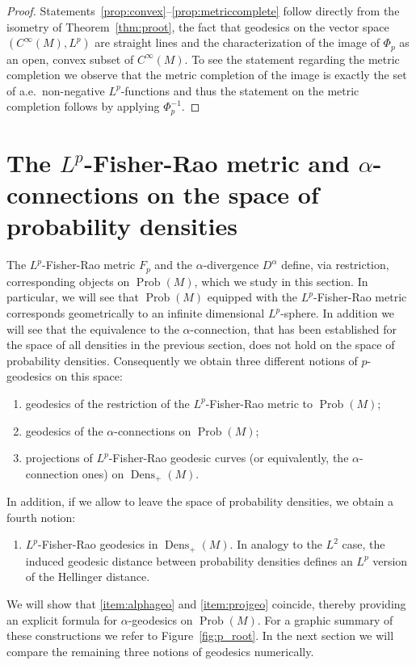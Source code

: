\documentclass[11pt]{amsart}
\theoremstyle{definition}
\newcommand{\Prob}{\operatorname{Prob}(M)}
\newcommand{\Dens}{\operatorname{Dens}_+(M)}
\begin{document}
\begin{proof}
Statements~\ref{prop:convex}--\ref{prop:metriccomplete} follow directly from the isometry of Theorem~\ref{thm:proot}, the fact that geodesics  on the vector space 
$(C^{\infty}(M),L^p)$ are straight lines and the characterization of the image of $\Phi_p$ as an open, convex subset of $C^{\infty}(M)$. To see the statement regarding the metric completion we observe that the metric completion of the image is exactly the set of a.e.~non-negative $L^p$-functions and thus the statement on the metric completion follows by applying $\Phi_p^{-1}$. 
\end{proof}





\section{The $L^p$-Fisher-Rao metric and $\alpha$-connections on the space of probability densities}\label{sec:prob}

The $L^p$-Fisher-Rao metric $F_p$ and the $\alpha$-divergence $D^{\alpha}$ define, via restriction, corresponding objects on $\Prob$, which we study in this section. 
In particular, we will see that $\Prob$ equipped with the $L^p$-Fisher-Rao metric corresponds geometrically to an infinite dimensional $L^p$-sphere. In addition we will see that the equivalence to the $\alpha$-connection, that has been established for the space of all densities in the previous section, does not hold on the space of probability densities. Consequently we obtain three different notions of $p$-geodesics on this space:
\begin{enumerate}
    \item geodesics of the restriction of the $L^p$-Fisher-Rao metric to $\Prob$; 
    \item \label{item:alphageo} geodesics of the $\alpha$-connections on $\Prob$;
    \item \label{item:projgeo} projections of $L^p$-Fisher-Rao geodesic curves (or equivalently, the $\alpha$-connection ones) on $\Dens$.
\end{enumerate}
In addition, if we allow to leave the space of probability densities, we obtain a fourth notion:
\begin{enumerate}[resume]
    \item $L^p$-Fisher-Rao geodesics in $\Dens$.
        In analogy to the $L^2$ case, the induced geodesic distance between probability densities defines an $L^p$ version of the Hellinger distance.
\end{enumerate}
We will show that \eqref{item:alphageo} and \eqref{item:projgeo} coincide, thereby providing an explicit formula for $\alpha$-geodesics on $\Prob$. For a graphic summary of these constructions we refer to Figure~\ref{fig:p_root}. 
In the next section we will compare the remaining three notions of geodesics numerically. 
\end{document}
